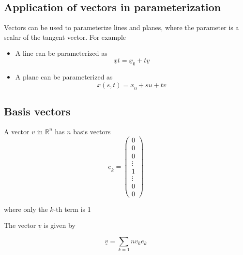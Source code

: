 \subsection{Application of vectors in parameterization}
\begin{framed}
Vectors can be used to parameterize lines and planes, where the parameter is a scalar of the tangent vector. For example

   \begin{itemize}
      \item A line can be parameterized  as  \[
        \underline{x}t = \underline{x}_0 + t \underline{v}
      \]
      \item A plane can be parameterized as \[
        \underline{x}(s, t) = \underline{x}_0 + s \underline{u} + t \underline{v}
      \] 
   \end{itemize}
\end{framed}


\subsection{Basis vectors}
\begin{framed}
A vector $\underline{v} $ in $\mathbb{R}^n$ has $n$ basis vectors \[
  \underline{e}_k = \begin{pmatrix}
    0 \\ 0 \\ 0 \\ \vdots\\ 1 \\ \vdots \\ 0 \\ 0
  \end{pmatrix}
\] 

where only the $k$-th term is 1

The vector $\underline{v}$ is given by

\[
   \underline{v} = \sum_{k=1}{n} v_{k}e_k
\] 
\end{framed}




